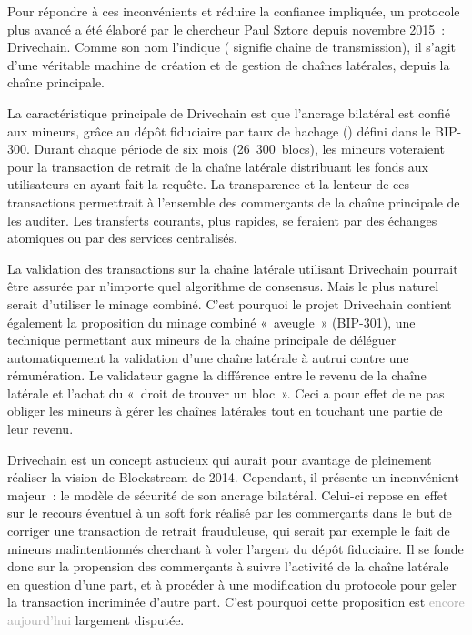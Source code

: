 
Pour répondre à ces inconvénients et réduire la confiance impliquée, un protocole plus avancé a été élaboré par le chercheur Paul Sztorc depuis novembre 2015~: Drivechain. Comme son nom l'indique ( signifie chaîne de transmission), il s'agit d'une véritable machine de création et de gestion de chaînes latérales, depuis la chaîne principale.

La caractéristique principale de Drivechain est que l'ancrage bilatéral est confié aux mineurs, grâce au dépôt fiduciaire par taux de hachage () défini dans le BIP-300. Durant chaque période de six mois (26~300~blocs), les mineurs voteraient pour la transaction de retrait de la chaîne latérale distribuant les fonds aux utilisateurs en ayant fait la requête. La transparence et la lenteur de ces transactions permettrait à l'ensemble des commerçants de la chaîne principale de les auditer. Les transferts courants, plus rapides, se feraient par des échanges atomiques ou par des services centralisés.

La validation des transactions sur la chaîne latérale utilisant Drivechain pourrait être assurée par n'importe quel algorithme de consensus. Mais le plus naturel serait d'utiliser le minage combiné. C'est pourquoi le projet Drivechain contient également la proposition du minage combiné «~aveugle~» (BIP-301), une technique permettant aux mineurs de la chaîne principale de déléguer automatiquement la validation d'une chaîne latérale à autrui contre une rémunération. Le validateur gagne la différence entre le revenu de la chaîne latérale et l'achat du «~droit de trouver un bloc~». Ceci a pour effet de ne pas obliger les mineurs à gérer les chaînes latérales tout en touchant une partie de leur revenu. %

Drivechain est un concept astucieux qui aurait pour avantage de pleinement réaliser la vision de Blockstream de 2014. Cependant, il présente un inconvénient majeur~: le modèle de sécurité de son ancrage bilatéral. Celui-ci repose en effet sur le recours éventuel à un soft fork réalisé par les commerçants dans le but de corriger une transaction de retrait frauduleuse, qui serait par exemple le fait de mineurs malintentionnés cherchant à voler l'argent du dépôt fiduciaire. Il se fonde donc sur la propension des commerçants à suivre l'activité de la chaîne latérale en question d'une part, et à procéder à une modification du protocole pour geler la transaction incriminée d'autre part. C'est pourquoi cette proposition est \textcolor{darkgray}{encore aujourd'hui} largement disputée.

